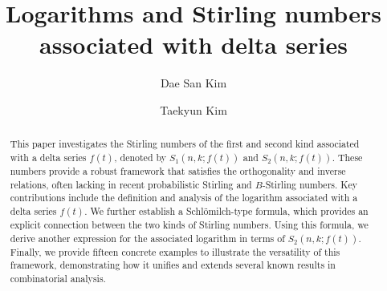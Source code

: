\documentclass[a4paper,11pt]{amsart}
\begin{document}
\title[Logarithms and Stirling numbers associated with delta series]{Logarithms and Stirling numbers associated with delta series}



\author{Dae San  Kim}
\address{Department of Mathematics, Sogang University, Seoul 121-742, Republic of Korea}

%
\author{Taekyun  Kim}
\address{Department of Mathematics, Kwangwoon University, Seoul 139-701, Republic of Korea}



\begin{abstract}
This paper investigates the Stirling numbers of the first and second kind associated with a delta series $f(t)$, denoted by $S_{1}(n,k; f(t))$ and $S_{2}(n,k; f(t))$. These numbers provide a robust framework that satisfies the orthogonality and inverse relations, often lacking in recent probabilistic Stirling and $B$-Stirling numbers. Key contributions include the definition and analysis of the logarithm associated with a delta series $f(t)$. We further establish a Schl\"{o}milch-type formula, which provides an explicit connection between the two kinds of Stirling numbers. Using this formula, we derive another expression for the associated logarithm in terms of $S_{2}(n,k; f(t))$. Finally, we provide fifteen concrete examples to illustrate the versatility of this framework, demonstrating how it unifies and extends several known results in combinatorial analysis.
\end{abstract}


\maketitle
\end{document}
